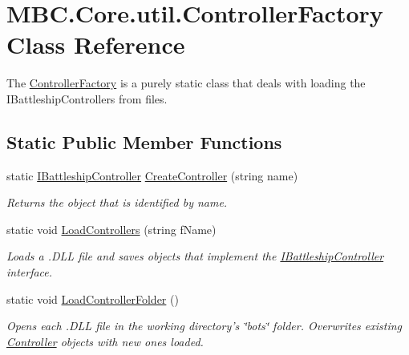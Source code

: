 \hypertarget{class_m_b_c_1_1_core_1_1util_1_1_controller_factory}{\section{M\-B\-C.\-Core.\-util.\-Controller\-Factory Class Reference}
\label{class_m_b_c_1_1_core_1_1util_1_1_controller_factory}
}


The \hyperlink{class_m_b_c_1_1_core_1_1util_1_1_controller_factory}{Controller\-Factory} is a purely static class that deals with loading the I\-Battleship\-Controllers from files.  


\subsection*{Static Public Member Functions}
\begin{DoxyCompactItemize}
\item 
static \hyperlink{interface_m_b_c_1_1_core_1_1_i_battleship_controller}{I\-Battleship\-Controller} \hyperlink{class_m_b_c_1_1_core_1_1util_1_1_controller_factory_ac10a922348ccb9df851b084948943f3d}{Create\-Controller} (string name)
\begin{DoxyCompactList}\small\item\em Returns the object that is identified by name.\end{DoxyCompactList}\item 
static void \hyperlink{class_m_b_c_1_1_core_1_1util_1_1_controller_factory_a8550517417616d362cbd96d7cf72f960}{Load\-Controllers} (string f\-Name)
\begin{DoxyCompactList}\small\item\em Loads a .D\-L\-L file and saves objects that implement the \hyperlink{interface_m_b_c_1_1_core_1_1_i_battleship_controller}{I\-Battleship\-Controller} interface.\end{DoxyCompactList}\item 
\hypertarget{class_m_b_c_1_1_core_1_1util_1_1_controller_factory_aaf07bf1747c9ffbaf9f61d1f9a9f7cad}{static void \hyperlink{class_m_b_c_1_1_core_1_1util_1_1_controller_factory_aaf07bf1747c9ffbaf9f61d1f9a9f7cad}{Load\-Controller\-Folder} ()}\label{class_m_b_c_1_1_core_1_1util_1_1_controller_factory_aaf07bf1747c9ffbaf9f61d1f9a9f7cad}

\begin{DoxyCompactList}\small\item\em Opens each .D\-L\-L file in the working directory's \char`\"{}bots\char`\"{} folder. Overwrites existing \hyperlink{class_m_b_c_1_1_core_1_1_controller}{Controller} objects with new ones loaded.\end{DoxyCompactList}\end{DoxyCompactItemize}
